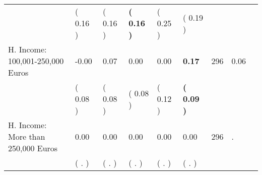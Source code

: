 \begin{tabular}{L{6.2cm} C{1.8cm} C{1.8cm} C{1.8cm} C{1.8cm} C{1.8cm} C{1.8cm} C{0.3cm} C{0.3cm}}
 & (     0.16 ) & (     0.16 ) & \textbf{(     0.16 )} & (     0.25 ) & (     0.19 )  & \\
H. Income: 100,001-250,000 Euros &     -0.00 &      0.07 &      0.00 &      0.00 & \textbf{     0.17}  & 296 &       0.06 \\ 
 & (     0.08 ) & (     0.08 ) & (     0.08 ) & (     0.12 ) & \textbf{(     0.09 )}  & \\
H. Income: More than 250,000 Euros &      0.00 &      0.00 &      0.00 &      0.00 &      0.00  & 296 &          . \\ 
 & (        . ) & (        . ) & (        . ) & (        . ) & (        . )  & \\
\bottomrule
\end{tabular}
